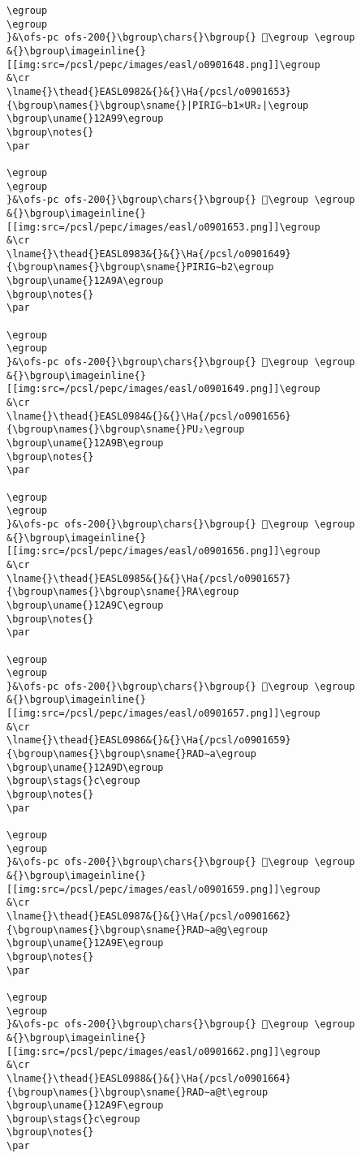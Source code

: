 \begin{verbatim}
\egroup
\egroup
}&\ofs-pc ofs-200{}\bgroup\chars{}\bgroup{} 𒪘\egroup \egroup
&{}\bgroup\imageinline{}[[img:src=/pcsl/pepc/images/easl/o0901648.png]]\egroup
&\cr
\lname{}\thead{}EASL0982&{}&{}\Ha{/pcsl/o0901653}{\bgroup\names{}\bgroup\sname{}|PIRIG∼b1×UR₂|\egroup
\bgroup\uname{}12A99\egroup
\bgroup\notes{}
\par 

\egroup
\egroup
}&\ofs-pc ofs-200{}\bgroup\chars{}\bgroup{} 𒪙\egroup \egroup
&{}\bgroup\imageinline{}[[img:src=/pcsl/pepc/images/easl/o0901653.png]]\egroup
&\cr
\lname{}\thead{}EASL0983&{}&{}\Ha{/pcsl/o0901649}{\bgroup\names{}\bgroup\sname{}PIRIG∼b2\egroup
\bgroup\uname{}12A9A\egroup
\bgroup\notes{}
\par 

\egroup
\egroup
}&\ofs-pc ofs-200{}\bgroup\chars{}\bgroup{} 𒪚\egroup \egroup
&{}\bgroup\imageinline{}[[img:src=/pcsl/pepc/images/easl/o0901649.png]]\egroup
&\cr
\lname{}\thead{}EASL0984&{}&{}\Ha{/pcsl/o0901656}{\bgroup\names{}\bgroup\sname{}PU₂\egroup
\bgroup\uname{}12A9B\egroup
\bgroup\notes{}
\par 

\egroup
\egroup
}&\ofs-pc ofs-200{}\bgroup\chars{}\bgroup{} 𒪛\egroup \egroup
&{}\bgroup\imageinline{}[[img:src=/pcsl/pepc/images/easl/o0901656.png]]\egroup
&\cr
\lname{}\thead{}EASL0985&{}&{}\Ha{/pcsl/o0901657}{\bgroup\names{}\bgroup\sname{}RA\egroup
\bgroup\uname{}12A9C\egroup
\bgroup\notes{}
\par 

\egroup
\egroup
}&\ofs-pc ofs-200{}\bgroup\chars{}\bgroup{} 𒪜\egroup \egroup
&{}\bgroup\imageinline{}[[img:src=/pcsl/pepc/images/easl/o0901657.png]]\egroup
&\cr
\lname{}\thead{}EASL0986&{}&{}\Ha{/pcsl/o0901659}{\bgroup\names{}\bgroup\sname{}RAD∼a\egroup
\bgroup\uname{}12A9D\egroup
\bgroup\stags{}c\egroup
\bgroup\notes{}
\par 

\egroup
\egroup
}&\ofs-pc ofs-200{}\bgroup\chars{}\bgroup{} 𒪝\egroup \egroup
&{}\bgroup\imageinline{}[[img:src=/pcsl/pepc/images/easl/o0901659.png]]\egroup
&\cr
\lname{}\thead{}EASL0987&{}&{}\Ha{/pcsl/o0901662}{\bgroup\names{}\bgroup\sname{}RAD∼a@g\egroup
\bgroup\uname{}12A9E\egroup
\bgroup\notes{}
\par 

\egroup
\egroup
}&\ofs-pc ofs-200{}\bgroup\chars{}\bgroup{} 𒪞\egroup \egroup
&{}\bgroup\imageinline{}[[img:src=/pcsl/pepc/images/easl/o0901662.png]]\egroup
&\cr
\lname{}\thead{}EASL0988&{}&{}\Ha{/pcsl/o0901664}{\bgroup\names{}\bgroup\sname{}RAD∼a@t\egroup
\bgroup\uname{}12A9F\egroup
\bgroup\stags{}c\egroup
\bgroup\notes{}
\par 


\end{verbatim}
